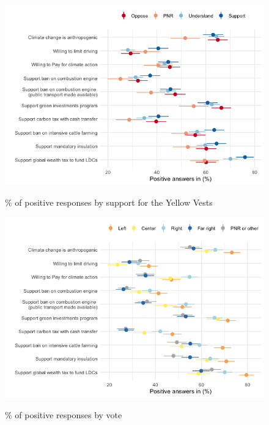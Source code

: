 \begin{framefont}{\small}
\begin{frame}{}%
\begin{figure}[h!]
\caption{\% of positive responses by support for the Yellow Vests}
\includegraphics[width=.7\paperwidth]{../figures/FR/positive_all_by_yellow_vests_FR.png} \\
\end{figure}
\end{frame}

\begin{frame}{}%
\begin{figure}[h!]
\caption{\% of positive responses by vote}
\includegraphics[width=.7\paperwidth]{../figures/FR/positive_all_by_vote_agg_FR.png} \\
\end{figure}
\end{frame}


\end{framefont}
